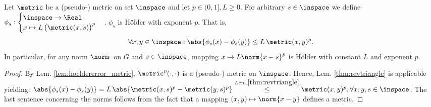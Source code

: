 \begin{thm} \label{thm:d2pmapishoelder}
Let $\metric$ be a (pseudo-) metric on set $\inspace$ and let $p \in (0,1], L \geq 0$. For arbitrary $s \in \inspace $ we define $\phi_s:\begin{cases}  \inspace \to \Real \\ x \mapsto L \, \bigl(\metric (x,s) \bigr)^p\end{cases}$.
$\phi_s $ is H\"older with exponent $p$. That is, \[\forall x,y \in \inspace : \abs{\phi_s(x) - \phi_s(y) } \leq L \, \metric (x,y)^p. \]
In particular, for any norm $\norm \cdot$ on $G$ and $s \in \inspace $, mapping $x \mapsto L \norm{x-s}^p$ is H\"older with constant $L$ and exponent $p$.

\begin{proof}
By Lem. \ref{lem:hoeldererror_metric}, $\metric^p(\cdot,\cdot)$ is a (pseudo-) metric on $\inspace$. Hence, Lem. \ref{thm:revtriangle} is applicable yielding:
$\abs{\phi_s(x) - \phi_s(y)} = L \, \abs{\metric(x,s)^p - \metric(y,s)^p} \stackrel{Lem. \ref{thm:revtriangle} } {\leq} \metric(x,y)^p, \forall x,y,s \in \inspace$. The last sentence concerning the norms follows from the fact that a mapping $(x,y) \mapsto \norm{x-y}$ defines a metric.
\end{proof}
\end{thm}



